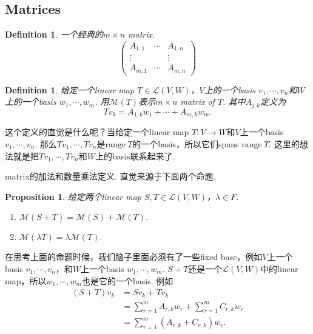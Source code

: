 \documentclass{article}
\newtheorem{proposition}[theorem]{Proposition}
\newtheorem{definition}[theorem]{Definition}
\newcommand*{\xfunc}[4]{{#2}\colon{#3}{#1}{#4}}
\newcommand*{\func}[3]{\xfunc{\to}{#1}{#2}{#3}}
\newcommand\range[1]{\text{range}\ #1}
\begin{document}
\newpage
\subsection{Matrices}

\begin{definition}
\rm 一个经典的$m \times n$ matrix.
$$
\begin{pmatrix}
A_{1,1} & \cdots & A_{1,n} \\
\vdots & & \vdots \\
A_{m,1} & \cdots & A_{m,n}
\end{pmatrix}
$$
\end{definition}

\begin{definition}
\rm 给定一个linear map $T \in \mathcal{L}(V,W)$，$V$上的一个basis $v_1,\cdots,v_n$和$W$上的一个basis $w_1,\cdots,w_m$. 用$\mathcal{M}(T)$表示$m \times n$ matrix of $T$. 其中$A_{j,k}$定义为
$$
Tv_k = A_{1,k}w_1 +  \cdots + A_{m,k}w_m.
$$
\end{definition}

这个定义的直觉是什么呢？当给定一个linear map $\func{T}{V}{W}$和$V$上一个basis $v_1,\cdots,v_n$. 那么$Tv_1,\cdots,Tv_n$是$\range{T}$的一个basis，所以它们spans $\range{T}$. 这里的想法就是把$Tv_1,\cdots,Tv_n$和$W$上的basis联系起来了.

{\color{red} matrix的加法和数量乘法定义}. 直觉来源于下面两个命题.

\begin{proposition}
\rm 给定两个linear map $S,T \in \mathcal{L}(V,W)$，$\lambda \in F.$
\begin{enumerate}
	\item $\mathcal{M}(S+T) = \mathcal{M}(S) + \mathcal{M}(T).$
	\item $\mathcal{M}(\lambda T) = \lambda \mathcal{M}(T).$
\end{enumerate}
\end{proposition}

在思考上面的命题时候，我们脑子里面必须有了一些fixed base，例如$V$上一个basis $v_1,\cdots,v_n$，和$W$上一个basis $w_1,\cdots,w_m$. $S+T$还是一个$\mathcal{L}(V,W)$中的linear map，所以$w_1,\cdots,w_m$也是它的一个basis. 例如
$$
\begin{aligned}
	(S+T)v_k &= Sv_k + Tv_k \\
			 &= \sum\limits_{r=1}^{m}A_{r,k}w_r + \sum\limits_{r=1}^{m}C_{r,k}w_r \\
			 &= \sum\limits_{r=1}^{m}(A_{r,k} + C_{r,k})w_r.  
\end{aligned}	
$$
\end{document}
